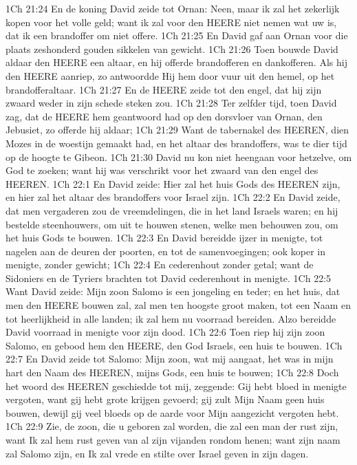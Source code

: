 1Ch 21:24  En de koning David zeide tot Ornan: Neen, maar ik zal het zekerlijk kopen voor het volle geld; want ik zal voor den HEERE niet nemen wat uw is, dat ik een brandoffer om niet offere.
1Ch 21:25  En David gaf aan Ornan voor die plaats zeshonderd gouden sikkelen van gewicht.
1Ch 21:26  Toen bouwde David aldaar den HEERE een altaar, en hij offerde brandofferen en dankofferen. Als hij den HEERE aanriep, zo antwoordde Hij hem door vuur uit den hemel, op het brandofferaltaar.
1Ch 21:27  En de HEERE zeide tot den engel, dat hij zijn zwaard weder in zijn schede steken zou.
1Ch 21:28  Ter zelfder tijd, toen David zag, dat de HEERE hem geantwoord had op den dorsvloer van Ornan, den Jebusiet, zo offerde hij aldaar;
1Ch 21:29  Want de tabernakel des HEEREN, dien Mozes in de woestijn gemaakt had, en het altaar des brandoffers, was te dier tijd op de hoogte te Gibeon.
1Ch 21:30  David nu kon niet heengaan voor hetzelve, om God te zoeken; want hij was verschrikt voor het zwaard van den engel des HEEREN.
1Ch 22:1  En David zeide: Hier zal het huis Gods des HEEREN zijn, en hier zal het altaar des brandoffers voor Israel zijn.
1Ch 22:2  En David zeide, dat men vergaderen zou de vreemdelingen, die in het land Israels waren; en hij bestelde steenhouwers, om uit te houwen stenen, welke men behouwen zou, om het huis Gods te bouwen.
1Ch 22:3  En David bereidde ijzer in menigte, tot nagelen aan de deuren der poorten, en tot de samenvoegingen; ook koper in menigte, zonder gewicht;
1Ch 22:4  En cederenhout zonder getal; want de Sidoniers en de Tyriers brachten tot David cederenhout in menigte.
1Ch 22:5  Want David zeide: Mijn zoon Salomo is een jongeling en teder; en het huis, dat men den HEERE bouwen zal, zal men ten hoogste groot maken, tot een Naam en tot heerlijkheid in alle landen; ik zal hem nu voorraad bereiden. Alzo bereidde David voorraad in menigte voor zijn dood.
1Ch 22:6  Toen riep hij zijn zoon Salomo, en gebood hem den HEERE, den God Israels, een huis te bouwen.
1Ch 22:7  En David zeide tot Salomo: Mijn zoon, wat mij aangaat, het was in mijn hart den Naam des HEEREN, mijns Gods, een huis te bouwen;
1Ch 22:8  Doch het woord des HEEREN geschiedde tot mij, zeggende: Gij hebt bloed in menigte vergoten, want gij hebt grote krijgen gevoerd; gij zult Mijn Naam geen huis bouwen, dewijl gij veel bloeds op de aarde voor Mijn aangezicht vergoten hebt.
1Ch 22:9  Zie, de zoon, die u geboren zal worden, die zal een man der rust zijn, want Ik zal hem rust geven van al zijn vijanden rondom henen; want zijn naam zal Salomo zijn, en Ik zal vrede en stilte over Israel geven in zijn dagen.
